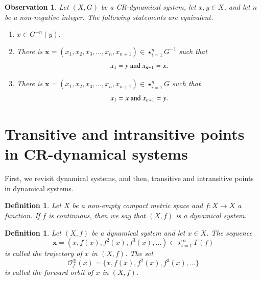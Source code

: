\documentclass[a4paper,12pt]{article} %
\newtheorem{definition}[theorem]{Definition}
\newtheorem{observation}[theorem]{Observation}
\begin{document}
\begin{observation}\label{trojcica}
Let $(X,G)$ be a CR-dynamical system,  let $x,y\in X$, and let $n$ be a non-negative integer.  The following statements are equivalent.
\begin{enumerate}
\item $x\in G^{-n}(y)$. 
\item There is $\mathbf x=(x_1,x_2,x_3,\ldots, x_{n},x_{n+1})\in \star_{i=1}^{n}G^{-1}$ such that 
$$
x_1=y \textup{ and } x_{n+1}=x.
$$
\item There is $\mathbf x=(x_1,x_2,x_3,\ldots, x_{n},x_{n+1})\in \star_{i=1}^{n}G$ such that 
$$
x_1=x \textup{ and } x_{n+1}=y.
$$
\end{enumerate} 
\end{observation}
\section{Transitive and intransitive points in CR-dynamical systems}\label{s1}
First, we revisit dynamical systems, and then,  transitive  and intransitive points in dynamical systems. 
\begin{definition}
Let $X$ be a non-empty compact metric space and $f:X\rightarrow X$ a function. If $f$ is continuous, then we say that $(X,f)$ is a dynamical system.
\end{definition}
\begin{definition}
Let $(X,f)$ be a dynamical system and let $x\in X$. The sequence 
$$
\mathbf x=(x,f(x),f^2(x),f^3(x),\ldots)\in \star_{i=1}^{\infty}\Gamma(f)
$$   
is called \emph{ \color{blue} the trajectory of $x$ in $(X,f)$.} The set 
$$
\mathcal O_f^{\oplus}(x)=\{x,f(x),f^2(x),f^3(x),\ldots\}
$$   
is called \emph{ \color{blue} the forward orbit of $x$ in $(X,f)$}.
\end{definition}
\end{document}
